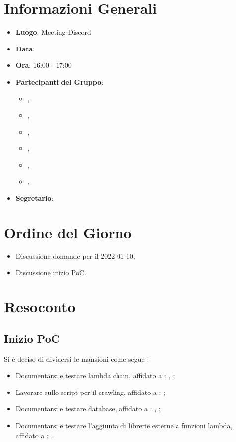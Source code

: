\section{Informazioni Generali}

\begin{itemize}
\item{\textbf{Luogo}}: Meeting Discord
\item{\textbf{Data}}: \D{}
\item{\textbf{Ora}}: 16:00 - 17:00
\item{\textbf{Partecipanti del Gruppo}}: 
	\begin{itemize}
	\item{\FP{},}
	\item{\GC{},}
	\item{\LW{},}
	\item{\MB{},}
	\item{\MG{},}
	\item{\PV{}.}
	\end{itemize} 
\item{\textbf{Segretario}}: \PV{}	
\end{itemize}

\section{Ordine del Giorno}
\begin{itemize}
\item{Discussione domande per il 2022-01-10;}
\item{Discussione inizio PoC.}

\end{itemize}

\section{Resoconto}

\subsection{Inizio PoC}
Si è deciso di dividersi le mansioni come segue :  
\begin{itemize}
    \item Documentarsi e testare lambda chain, affidato a : \textit{\MG{}, \PV{}};
    \item Lavorare sullo script per il crawling, affidato a  : \textit{\FP{}};
    \item Documentarsi e testare database,  affidato a : \textit{\GC{}, \LW{}};
    \item Documentarsi e testare l'aggiunta di librerie esterne a funzioni lambda, affidato a : \textit{\MB{}}.
\end{itemize}


